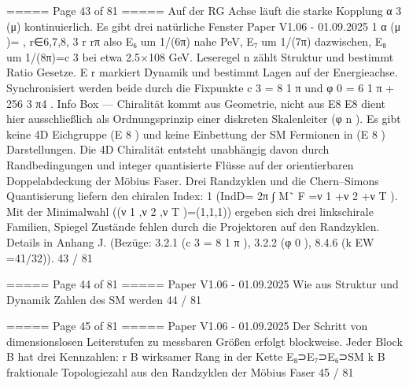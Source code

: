 \begin{MyVerbatim}
{===== Page 43 of 81 =====
Auf der RG Achse läuft die starke Kopplung α 3 (μ) kontinuierlich. Es gibt drei natürliche Fenster
Paper V1.06 - 01.09.2025
1
α (μ )= , r∈{6,7,8},
3 r rπ
also E₆ um 1/(6π) nahe PeV, E₇ um 1/(7π) dazwischen, E₈ um 1/(8π)=c 3 bei etwa 2.5×108 GeV.
Leseregel
n zählt Struktur und bestimmt Ratio Gesetze.
E r markiert Dynamik und bestimmt Lagen auf der Energieachse.
Synchronisiert werden beide durch die Fixpunkte c 3 = 8 1 π und φ 0 = 6 1 π + 256 3 π4 .
Info Box — Chiralität kommt aus Geometrie, nicht aus E8
E8 dient hier ausschließlich als Ordnungsprinzip einer diskreten Skalenleiter (φ n ).
Es gibt keine 4D Eichgruppe (E 8 ) und keine Einbettung der SM Fermionen in (E 8 ) Darstellungen.
Die 4D Chiralität entsteht unabhängig davon durch Randbedingungen und integer quantisierte Flüsse auf der
orientierbaren Doppelabdeckung der Möbius Faser.
Drei Randzyklen und die Chern–Simons Quantisierung liefern den chiralen Index:
1
(IndD=
2π
∫
M˜
F =ν
1
+ν
2
+ν
T
).
Mit der Minimalwahl ((ν 1 ,ν 2 ,ν T )=(1,1,1)) ergeben sich drei linkschirale Familien, Spiegel Zustände fehlen durch
die Projektoren auf den Randzyklen.
Details in Anhang J. (Bezüge: 3.2.1 (c 3 = 8 1 π ), 3.2.2 (φ 0 ), 8.4.6 (k EW =41/32)).
43 / 81

===== Page 44 of 81 =====
Paper V1.06 - 01.09.2025
Wie aus Struktur und Dynamik Zahlen des SM werden
44 / 81

===== Page 45 of 81 =====
Paper V1.06 - 01.09.2025
Der Schritt von dimensionslosen Leiterstufen zu messbaren Größen erfolgt blockweise. Jeder Block B hat drei
Kennzahlen:
r B wirksamer Rang in der Kette E₈⊃E₇⊃E₆⊃SM
k B fraktionale Topologiezahl aus den Randzyklen der Möbius Faser
45 / 81

}
\end{MyVerbatim}
